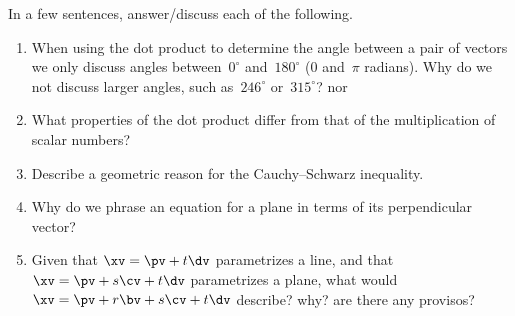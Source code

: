 \begin{exercise}  
In a few sentences, answer\slash discuss each of the following.
\begin{enumerate}
\item When using the dot product to determine the angle between a pair of vectors we only discuss angles between~\(0^\circ\) and~\(180^\circ\) (\(0\) and~\(\pi\) radians).  
Why do we not discuss larger angles, such as~\(246^\circ\) or~\(315^\circ\)? nor 

\item What properties of the dot product differ from that of the multiplication of scalar numbers?

\item Describe a geometric reason for the Cauchy--Schwarz inequality.

\item Why do we phrase an equation for a plane in terms of its perpendicular vector?

\item Given that \(\xv=\pv+t\dv\) parametrizes a line, and that \(\xv=\pv+s\cv+t\dv\) parametrizes a plane, what would \(\xv=\pv+r\bv+s\cv+t\dv\) describe? why? are there any provisos?

\end{enumerate}
\end{exercise}


